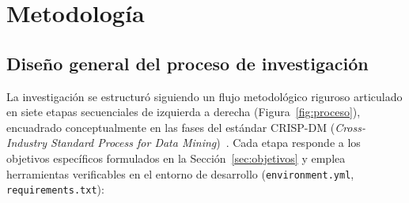 \documentclass[12pt,a4paper]{article}
\begin{document}
\newpage
\section{Metodología}
\label{sec:metodologia}

\subsection{Diseño general del proceso de investigación}
\label{sec:crispdm}
La investigación se estructuró siguiendo un flujo metodológico riguroso articulado en siete etapas secuenciales de izquierda a derecha (Figura~\ref{fig:proceso}), encuadrado conceptualmente en las fases del estándar CRISP-DM (\emph{Cross-Industry Standard Process for Data Mining})~\cite{wirth2000crispdm,chapman2000crispdm}. Cada etapa responde a los objetivos específicos formulados en la Sección~\ref{sec:objetivos} y emplea herramientas verificables en el entorno de desarrollo (\texttt{environment.yml}, \texttt{requirements.txt}):
\end{document}
